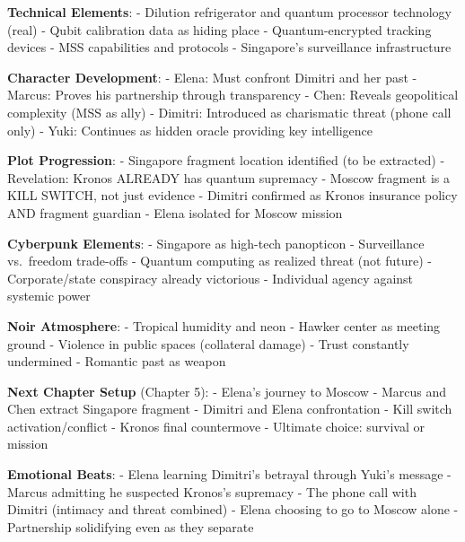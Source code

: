 \textbf{Technical Elements}: - Dilution refrigerator and quantum
processor technology (real) - Qubit calibration data as hiding place -
Quantum-encrypted tracking devices - MSS capabilities and protocols -
Singapore's surveillance infrastructure

\textbf{Character Development}: - Elena: Must confront Dimitri and her
past - Marcus: Proves his partnership through transparency - Chen:
Reveals geopolitical complexity (MSS as ally) - Dimitri: Introduced as
charismatic threat (phone call only) - Yuki: Continues as hidden oracle
providing key intelligence

\textbf{Plot Progression}: - Singapore fragment location identified (to
be extracted) - Revelation: Kronos ALREADY has quantum supremacy -
Moscow fragment is a KILL SWITCH, not just evidence - Dimitri confirmed
as Kronos insurance policy AND fragment guardian - Elena isolated for
Moscow mission

\textbf{Cyberpunk Elements}: - Singapore as high-tech panopticon -
Surveillance vs.~freedom trade-offs - Quantum computing as realized
threat (not future) - Corporate/state conspiracy already victorious -
Individual agency against systemic power

\textbf{Noir Atmosphere}: - Tropical humidity and neon - Hawker center
as meeting ground - Violence in public spaces (collateral damage) -
Trust constantly undermined - Romantic past as weapon

\textbf{Next Chapter Setup} (Chapter 5): - Elena's journey to Moscow -
Marcus and Chen extract Singapore fragment - Dimitri and Elena
confrontation - Kill switch activation/conflict - Kronos final
countermove - Ultimate choice: survival or mission

\textbf{Emotional Beats}: - Elena learning Dimitri's betrayal through
Yuki's message - Marcus admitting he suspected Kronos's supremacy - The
phone call with Dimitri (intimacy and threat combined) - Elena choosing
to go to Moscow alone - Partnership solidifying even as they separate
